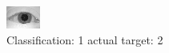 \begin{figure}[h!]
\begin{center}
\includegraphics[width=0.60\columnwidth]{figures/ID1003_class_1_target_2.png}
\end{center}
\caption{ Classification: 1 actual target: 2}
\label{fig:ID1003_class_1_target_2}
\end{figure}
